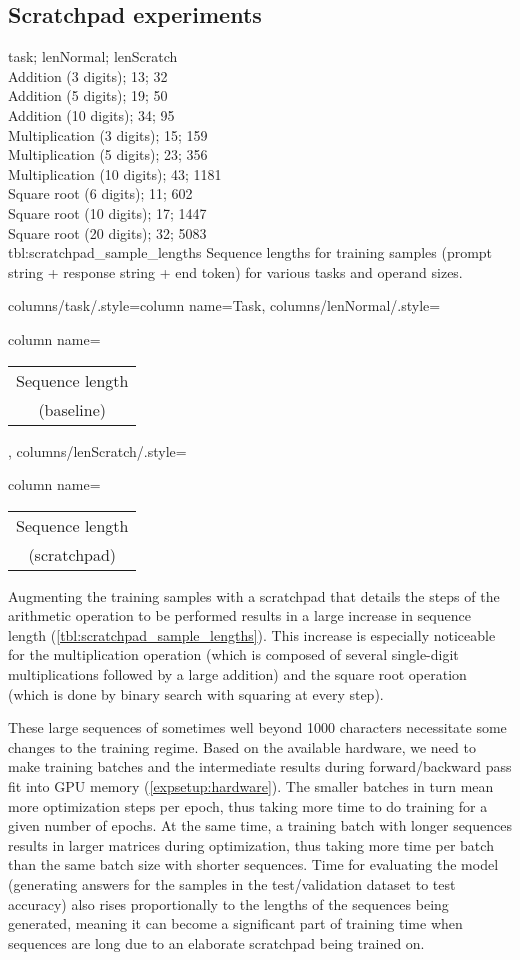 \subsection{Scratchpad experiments}



\label{scratchpad_changes}

{
	task; lenNormal; lenScratch\\
	Addition (3 digits); 13; 32 \\
	Addition (5 digits); 19; 50 \\
	Addition (10 digits); 34; 95 \\
	Multiplication (3 digits); 15; 159 \\
	Multiplication (5 digits); 23; 356 \\
	Multiplication (10 digits); 43; 1181 \\
	Square root (6 digits); 11; 602 \\
	Square root (10 digits); 17; 1447 \\
	Square root (20 digits); 32; 5083 \\
}
{tbl:scratchpad_sample_lengths}
{
	Sequence lengths for training samples (prompt string + response string + end token) for various tasks and operand sizes.
}
{%
	columns/task/.style={column name={Task}},
	columns/lenNormal/.style={column name={\begin{tabular}{c} Sequence length \\ (baseline) \\ \end{tabular}}},
	columns/lenScratch/.style={column name={\begin{tabular}{c} Sequence length \\ (scratchpad) \\ \end{tabular}}}
}

Augmenting the training samples with a scratchpad that details the steps of the arithmetic operation to be performed results in a large increase in sequence length (\cref{tbl:scratchpad_sample_lengths}). This increase is especially noticeable for the multiplication operation (which is composed of several single-digit multiplications followed by a large addition) and the square root operation (which is done by binary search with squaring at every step).

These large sequences of sometimes well beyond 1000 characters necessitate some changes to the training regime. Based on the available hardware, we need to make training batches and the intermediate results during forward/backward pass fit into GPU memory (\cref{expsetup:hardware}). The smaller batches in turn mean more optimization steps per epoch, thus taking more time to do training for a given number of epochs. At the same time, a training batch with longer sequences results in larger matrices during optimization, thus taking more time per batch than the same batch size with shorter sequences.
Time for evaluating the model (generating answers for the samples in the test/validation dataset to test accuracy) also rises proportionally to the lengths of the sequences being generated, meaning it can become a significant part of training time when sequences are long due to an elaborate scratchpad being trained on.

